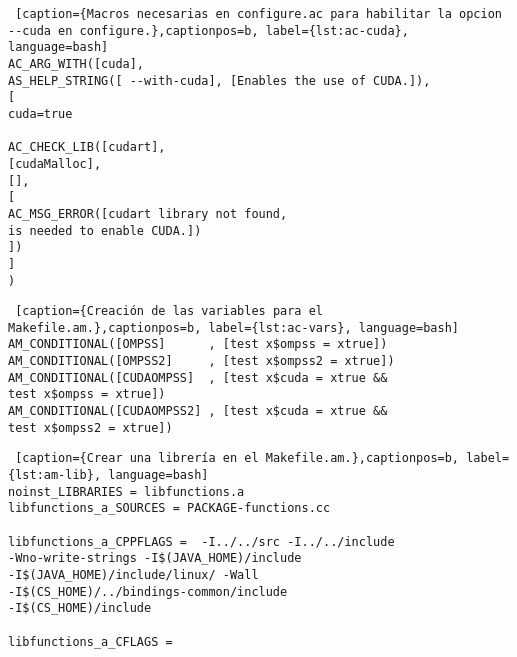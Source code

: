 \smallskip

\begin{lstlisting} [caption={Macros necesarias en configure.ac para habilitar la opcion --cuda en configure.},captionpos=b, label={lst:ac-cuda}, language=bash]
AC_ARG_WITH([cuda],
AS_HELP_STRING([ --with-cuda], [Enables the use of CUDA.]),
[
cuda=true

AC_CHECK_LIB([cudart], 
[cudaMalloc], 
[],
[
AC_MSG_ERROR([cudart library not found, 
is needed to enable CUDA.])
])
]
)
\end{lstlisting}

\smallskip

\begin{lstlisting} [caption={Creación de las variables para el Makefile.am.},captionpos=b, label={lst:ac-vars}, language=bash]
AM_CONDITIONAL([OMPSS]      , [test x$ompss = xtrue])
AM_CONDITIONAL([OMPSS2]     , [test x$ompss2 = xtrue])
AM_CONDITIONAL([CUDAOMPSS]  , [test x$cuda = xtrue && 
test x$ompss = xtrue])
AM_CONDITIONAL([CUDAOMPSS2] , [test x$cuda = xtrue && 
test x$ompss2 = xtrue])
\end{lstlisting}

\smallskip

\begin{lstlisting} [caption={Crear una librería en el Makefile.am.},captionpos=b, label={lst:am-lib}, language=bash]
noinst_LIBRARIES = libfunctions.a
libfunctions_a_SOURCES = PACKAGE-functions.cc

libfunctions_a_CPPFLAGS =  -I../../src -I../../include
-Wno-write-strings -I$(JAVA_HOME)/include 
-I$(JAVA_HOME)/include/linux/ -Wall
-I$(CS_HOME)/../bindings-common/include
-I$(CS_HOME)/include 

libfunctions_a_CFLAGS =
\end{lstlisting}

\smallskip

